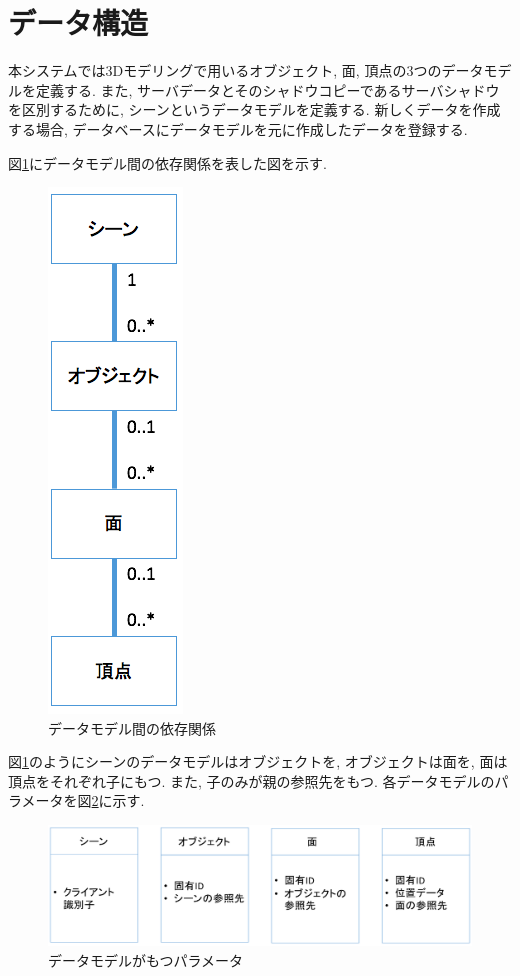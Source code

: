 \section{データ構造}
本システムでは3Dモデリングで用いるオブジェクト, 面, 頂点の3つのデータモデルを定義する.
また, サーバデータとそのシャドウコピーであるサーバシャドウを区別するために, シーンというデータモデルを定義する.
新しくデータを作成する場合, データベースにデータモデルを元に作成したデータを登録する.
\par
図\ref{データ構造}にデータモデル間の依存関係を表した図を示す.
\begin{figure}[]
  \begin{center}
    \includegraphics[scale=0.5]{images/er}
    \caption{データモデル間の依存関係}
    \label{データ構造}
  \end{center}
\end{figure}
図\ref{データ構造}のようにシーンのデータモデルはオブジェクトを, オブジェクトは面を, 面は頂点をそれぞれ子にもつ. また, 子のみが親の参照先をもつ.
各データモデルのパラメータを図\ref{パラメータ}に示す.
\begin{figure}[]
  \begin{center}
    \includegraphics[scale=0.3]{images/prop}
    \caption{データモデルがもつパラメータ}
    \label{パラメータ}
  \end{center}
\end{figure}
